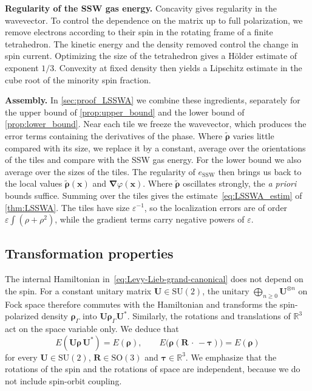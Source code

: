 \documentclass[final,reqno]{amsart}
\theoremstyle{remark}
\renewcommand{\ge}{\geqslant}
\renewcommand{\epsilon}{\varepsilon}
\newcommand{\wt}[1]{\widetilde{#1}}
\newcommand{\RR}{\mathbb{R}}
\newcommand{\SO}{\mathrm{SO}}
\newcommand{\SU}{\mathrm{SU}}
\newcommand{\SSW}{\mathrm{SSW}}
\newcommand{\grad}{\bm{\nabla}}
\begin{document}
\medskip

\noindent\textbf{Regularity of the SSW gas energy.} Concavity gives regularity in the wavevector. To control the dependence on the matrix up to full polarization, we remove electrons according to their spin in the rotating frame of a finite tetrahedron. The kinetic energy and the density removed control the change in spin current. Optimizing the size of the tetrahedron gives a H\"older estimate of exponent $1/3$. Convexity at fixed density then yields a Lipschitz estimate in the cube root of the minority spin fraction.

\medskip

\noindent\textbf{Assembly.} In \cref{sec:proof_LSSWA} we combine these ingredients, separately for the upper bound of \cref{prop:upper_bound} and the lower bound of \cref{prop:lower_bound}. Near each tile we freeze the wavevector, which produces the error terms containing the derivatives of the phase. Where $\wt{\bm{\rho}}$ varies little compared with its size, we replace it by a constant, average over the orientations of the tiles and compare with the SSW gas energy. For the lower bound we also average over the sizes of the tiles. The regularity of $e_\SSW$ then brings us back to the local values $\wt{\bm{\rho}}(\mathbf{x})$ and $\grad\varphi(\mathbf{x})$. Where $\wt{\bm{\rho}}$ oscillates strongly, the \emph{a priori} bounds suffice. Summing over the tiles gives the estimate~\cref{eq:LSSWA_estim} of \cref{thm:LSSWA}. The tiles have size $\epsilon^{-1}$, so the localization errors are of order $\epsilon\int(\rho+\rho^2)$, while the gradient terms carry negative powers of $\epsilon$.

\subsection{Transformation properties}\label{sec:transformations}
The internal Hamiltonian in~\cref{eq:Levy-Lieb-grand-canonical} does not depend on the spin. For a constant unitary matrix $\mathbf{U}\in \SU(2)$, the unitary $\bigoplus_{n\ge0}\mathbf{U}^{\otimes n}$ on Fock space therefore commutes with the Hamiltonian and transforms the spin-polarized density $\bm{\rho}_\Gamma$ into $\mathbf{U}\bm{\rho}_\Gamma \mathbf{U}^*$. Similarly, the rotations and translations of $\RR^3$ act on the space variable only. We deduce that
\begin{equation}\label{eq:invariance}
E(\mathbf{U}\bm{\rho}\,\mathbf{U}^*)=E(\bm{\rho}),\qquad E\big(\bm{\rho}(\mathbf{R}\,\cdot\,-\bm{\tau})\big)=E(\bm{\rho})
\end{equation}
for every $\mathbf{U}\in \SU(2)$, $\mathbf{R}\in \SO(3)$ and $\bm{\tau}\in\RR^3$. We emphasize that the rotations of the spin and the rotations of space are independent, because we do not include spin-orbit coupling.
\end{document}
